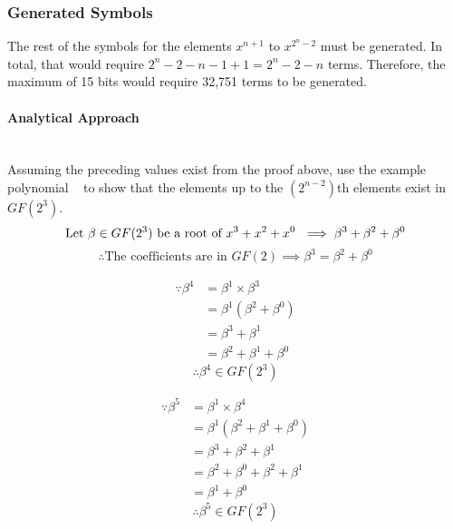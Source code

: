     \subsubsection{Generated Symbols} The rest of the symbols for the elements
    $x^{n+1}$ to $x^{2^{n}-2}$ must be generated. In total, that would require
    $2^{n}-2-n-1+1=2^{n}-2-n$ terms. Therefore, the maximum of 15 bits would
    require 32,751 terms to be generated.

        \paragraph{Analytical Approach} \leavevmode \\ Assuming the preceding
        values exist from the proof above, use the example polynomial
        \examplepoly~ to show that the elements up to the $(2^{n-2})$th
        elements exist in $GF(2^{3})$.
        \[ \text{Let }\beta \in GF(2^{3}) \text{ be a root of
        $x^{3}+x^{2}+x^{0}$~} \implies \beta^{3} + \beta^{2} + \beta^{0} \]
        \[ \therefore \text{The coefficients are in } GF(2) \implies \beta^{3}
        = \beta^{2} + \beta^{0} \]
        \begin{minipage}[t]{0.5\textwidth}
            \begin{equation*}
                \begin{split}
                    \because \beta^{4} & = \beta^{1} \times \beta^{3} \\
                    & = \beta^{1} (\beta^{2}+\beta^{0}) \\
                    & = \beta^{3}+\beta^{1} \\
                    & = \beta^{2}+\beta^{1}+\beta^{0}
                \end{split}
            \end{equation*}
            \[ \therefore \beta^{4} \in GF(2^{3}) \]
        \end{minipage}
        \begin{minipage}[t]{0.5\textwidth}
            \begin{equation*}
                \begin{split}
                    \because \beta^{5} & = \beta^{1} \times \beta^{4} \\
                    & = \beta^{1} (\beta^{2}+\beta^{1}+\beta^{0}) \\
                    & = \beta^{3}+\beta^{2}+\beta^{1} \\
                    & = \beta^{2}+\beta^{0}+\beta^{2}+\beta^{1} \\
                    & = \beta^{1}+\beta^{0}
                \end{split}
            \end{equation*}
            \[ \therefore \beta^{5} \in GF(2^{3}) \]
        \end{minipage}

